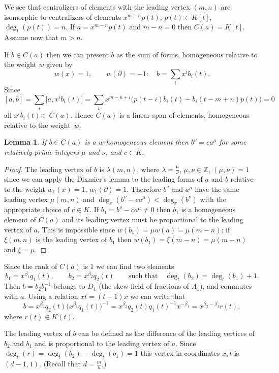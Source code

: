 \documentclass[10pt,a4paper]{amsart}
\numberwithin{equation}{section}
\newtheorem{Lemma}[Theorem]{Lemma}
\newcommand{\de}{\partial}
\newcommand{\Z}{\mathbb Z}
\newcommand{\be}{\beta}
\newcommand{\la}{\lambda}
\begin{document}
We see that centralizers of elements with the leading vertex $(m,n)$ are isomorphic to centra\-li\-zers of elements $x^{m-n}p(t)$, $p(t) \in K[t]$, $\deg_t(p(t)) = n$.
If $a = x^{m-n}p(t)$ and $m - n = 0$ then $C(a) = K[t]$. Assume now that $m > n$.

If $b \in C(a)$ then we can present $b$ as the sum of forms, homogeneous relative to the weight $w$ given by
\[
w(x) = 1,\qquad
w(\de) = -1\colon\quad b = \sum_i x^ib_i(t).
\]
Since
\[
[a,b] = \sum_i\big[a, x^ib_i(t)\big] =
\sum _i x^{m-n + i}\big(p(t-i)b_i(t) - b_i(t - m + n)p(t)\big) = 0
\]
all $x^ib_i(t) \in C(a)$. Hence $C(a)$ is a linear span of elements, homogeneous relative to the weight~$w$.

\begin{Lemma}\label{lemma2}
If $b \in C(a)$ is a $w$-homogeneous element then $b^\nu = ca^\mu$ for some relatively prime integers $\mu$ and $\nu$, and $c \in K$.
\end{Lemma}

\begin{proof}
The leading vertex of $b$ is $\la(m,n)$, where $\la = \frac{\mu}{\nu}$, $\mu, \nu \in \Z$, $(\mu,\nu) = 1$ since we can apply the Dixmier's lemma to the leading forms of $a$ and $b$ relative to the weight $w_1(x) = 1$, $w_1(\de) = 1$. Therefore $b^\nu$ and $a^\mu$ have the same leading vertex $\mu(m,n)$ and $\deg_x(b^\nu - ca^\mu) < \deg_x(b^\nu)$ with the appropriate choice of $c \in K$.
If $b_1 = b^\nu - ca^\mu \ne 0$ then $b_1$ is a homogeneous element of $C(a)$ and its leading vertex must be proportional to the leading vertex of $a$.
This is impossible since $w(b_1) = \mu w(a) = \mu(m-n)$: if $\xi(m,n)$ is the leading vertex of $b_1$ then $w(b_1) = \xi(m-n) = \mu(m-n)$ and $\xi = \mu$.
\end{proof}

Since the rank of $C(a)$ is $1$ we can find two elements
\[
b_1 = x^{\be_1}q_1(t), \qquad
b_2 = x^{\be_2}q_2(t)\qquad
\text{such that}\quad
\deg_t(b_2) = \deg_t(b_1) + 1.
\]
Then $b = b_2b_1^{-1}$ belongs to $D_1$ (the skew field of fractions of $A_1$), and commutes with $a$. Using a relation $xt = (t-1)x$ we can write that
\[
b = x^{\be_2}q_2(t)\big(x^{\be_1}q_1(t)\big)^{-1} = x^{\be_2}q_2(t)q_1(t)^{-1}x^{-\be_1} = x^{\be_2-\be_1}r(t),
\]
where $r(t) \in K(t)$.

The leading vertex of $b$ can be defined as the difference of the leading vertices of $b_2$ and $b_1$ and is proportional to the leading vertex of $a$. Since $\deg_t(r) = \deg_t(b_2) - \deg_t(b_1) = 1$ this vertex in coordinates $x, t$ is $(d-1,1)$. (Recall that $d = \frac{m}{n}$.)
\end{document}
